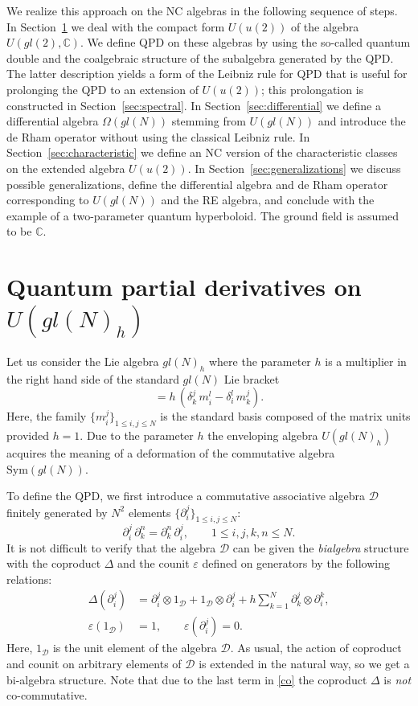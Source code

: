 \documentclass[11pt]{article}
\newcommand{\pa}{\partial}
\newcommand{\hl}{m}
\newcommand{\de}{\delta}
\newcommand{\De}{\Delta}
\newcommand{\ot}{\otimes}
\newcommand{\C}{\mathbb{C}}
\newcommand{\DD}{\mathcal{D}}
\newcommand{\Om}{\Omega}
\numberwithin{equation}{section}
\theoremstyle{plain}
\theoremstyle{definition}
\begin{document}
We realize this approach on the NC algebras in the following sequence of steps. In Section~\ref{sec:2} we deal with the compact
form $U(u(2))$ of the algebra $U(gl(2), \C)$. We define QPD on these algebras by using the so-called quantum double and
the coalgebraic structure of the subalgebra generated by the QPD. The latter description yields a form of the Leibniz rule for
QPD that is useful for prolonging the QPD to an extension of $U(u(2))$; this prolongation is constructed in
Section~\ref{sec:spectral}. In Section~\ref{sec:differential} we define a differential algebra $\Om(gl(N))$ stemming from
$U(gl(N))$ and introduce the de Rham operator without using the classical Leibniz rule. In Section~\ref{sec:characteristic} we define
an NC version of the characteristic classes on the extended algebra $U(u(2))$. In Section~\ref{sec:generalizations} we discuss
possible generalizations, define the differential algebra and de Rham operator corresponding to $U(gl(N))$ and the RE algebra,
and conclude with the example of a two-parameter quantum hyperboloid.
The ground field is assumed to be $\C$.

\section[Quantum partial derivatives on U(gl(N)h)]{Quantum partial derivatives on $U(gl(N)_h)$}
\label{sec:2}

Let us consider the Lie algebra $gl(N)_h$ where the parameter $h$ is a multiplier in the right hand side of the standard
$gl(N)$ Lie bracket
\begin{equation}
[\hl_i^j\,, \hl_k^l]=h\,(\de_k^j\, \hl_i^l-\de_i^l\, \hl_k^j).
\label{gl-h}
\end{equation}
Here, the family $\{\hl_i^j\}_{1\leq i,j\leq N}$ is the standard   basis composed of  the matrix units provided $h=1$. Due to the parameter $h$ the enveloping algebra $U(gl(N)_h)$
acquires the meaning of a deformation of the commutative algebra $\mathrm{Sym}(gl(N))$.

To define the QPD, we first introduce a commutative associative algebra $\DD$ finitely generated by $N^2$ elements
$\{\partial_i^j\}_{1\le i,j\le N}$:
\[
\partial_i^j\,\partial_k^n = \partial_k^n\,\partial_i^j,\qquad 1\le i,j,k,n\le N.
\]
It is not difficult to verify that the algebra $\DD$ can be given the \emph{bialgebra} structure with the coproduct $\Delta$
and the counit $\varepsilon$ defined on generators by the following relations:
\begin{align}
\De(\pa_i^j) &= \pa_i^j\ot 1_\DD+1_\DD\ot \pa_i^j
+h\sum_{k=1}^N \pa^j_k\ot \pa_i^k, \label{co}\\
\varepsilon(1_\DD) &= 1, \qquad \varepsilon(\partial_i^j)=0. \label{coun}
\end{align}
Here, $1_\DD$ is the unit element of the algebra $\DD$. As usual, the action of coproduct and counit on arbitrary elements of $\DD$
is extended in the natural way, so we get a bi-algebra structure. Note that due to the last term in \eqref{co} the coproduct $\Delta$ is \emph{not}
co-commutative.
\end{document}
